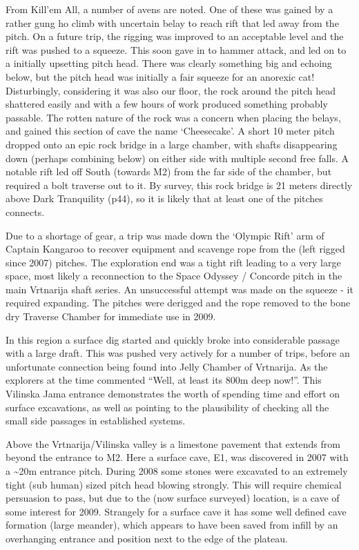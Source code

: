 From Kill'em All, a number of avens are noted. One of these was gained
by a rather gung ho climb with uncertain belay to reach rift that led
away from the pitch. On a future trip, the rigging was improved to an
acceptable level and the rift was pushed to a squeeze. This soon gave in
to hammer attack, and led on to a initially upsetting pitch head. There
was clearly something big and echoing below, but the pitch head was
initially a fair squeeze for an anorexic cat! Disturbingly, considering
it was also our floor, the rock around the pitch head shattered easily
and with a few hours of work produced something probably passable. The
rotten nature of the rock was a concern when placing the belays, and
gained this section of cave the name `Cheesecake'. A short 10 meter
pitch dropped onto an epic rock bridge in a large chamber, with shafts
disappearing down (perhaps combining below) on either side with multiple
second free falls. A notable rift led off South (towards M2) from the
far side of the chamber, but required a bolt traverse out to it. By
survey, this rock bridge is 21 meters directly above Dark Tranquility
(p44), so it is likely that at least one of the pitches connects.

Due to a shortage of gear, a trip was made down the `Olympic Rift' arm
of Captain Kangaroo to recover equipment and scavenge rope from the
(left rigged since 2007) pitches. The exploration end was a tight rift
leading to a very large space, most likely a reconnection to the Space
Odyssey / Concorde pitch in the main Vrtnarija shaft series. An
unsuccessful attempt was made on the squeeze - it required expanding.
The pitches were derigged and the rope removed to the bone dry Traverse
Chamber for immediate use in 2009.

In this region a surface dig started and quickly broke into considerable
passage with a large draft. This was pushed very actively for a number
of trips, before an unfortunate connection being found into Jelly
Chamber of Vrtnarija. As the explorers at the time commented ``Well, at
least its 800m deep now!''. This Vilinska Jama entrance demonstrates the
worth of spending time and effort on surface excavations, as well as
pointing to the plausibility of checking all the small side passages in
established systems.

Above the Vrtnarija/Vilinska valley is a limestone pavement that extends
from beyond the entrance to M2. Here a surface cave, E1, was discovered
in 2007 with a \textasciitilde{}20m entrance pitch. During 2008 some
stones were excavated to an extremely tight (sub human) sized pitch head
blowing strongly. This will require chemical persuasion to pass, but due
to the (now surface surveyed) location, is a cave of some interest for
2009. Strangely for a surface cave it has some well defined cave
formation (large meander), which appears to have been saved from infill
by an overhanging entrance and position next to the edge of the plateau.

